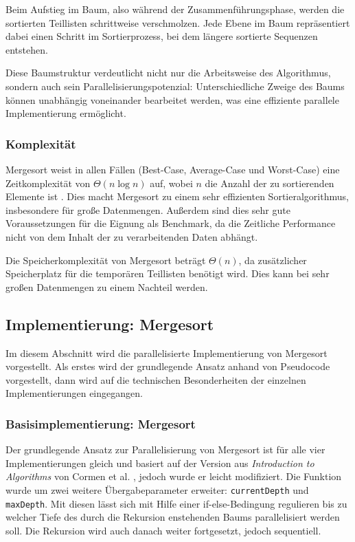 \documentclass[fontsize=12pt,paper=a4,twoside=semi,parskip=half-,headsepline,headinclude]{scrreprt}
\begin{document}
Beim Aufstieg im Baum, also während der Zusammenführungsphase, werden die sortierten Teillisten schrittweise verschmolzen. Jede Ebene im Baum repräsentiert dabei einen Schritt im Sortierprozess, bei dem längere sortierte Sequenzen entstehen.

Diese Baumstruktur verdeutlicht nicht nur die Arbeitsweise des Algorithmus, sondern auch sein Parallelisierungspotenzial: Unterschiedliche Zweige des Baums können unabhängig voneinander bearbeitet werden, was eine effiziente parallele Implementierung ermöglicht.

\subsubsection{Komplexität}

Mergesort weist in allen Fällen (Best-Case, Average-Case und Worst-Case) eine Zeitkomplexität von $\Theta(n \log n)$ auf, wobei $n$ die Anzahl der zu sortierenden Elemente ist \cite{Cormen2022}. Dies macht Mergesort zu einem sehr effizienten Sortieralgorithmus, insbesondere für große Datenmengen. Außerdem sind dies sehr gute Voraussetzungen für die Eignung als Benchmark, da die Zeitliche Performance nicht von dem Inhalt der zu verarbeitenden Daten abhängt.

Die Speicherkomplexität von Mergesort beträgt $\Theta(n)$, da zusätzlicher Speicherplatz für die temporären Teillisten benötigt wird. Dies kann bei sehr großen Datenmengen zu einem Nachteil werden.


\subsection{Implementierung: Mergesort}

Im diesem Abschnitt wird die parallelisierte Implementierung von Mergesort vorgestellt. Als erstes wird der grundlegende Ansatz anhand von Pseudocode vorgestellt, dann wird auf die technischen Besonderheiten der einzelnen Implementierungen eingegangen.

\subsubsection{Basisimplementierung: Mergesort}
\label{subsubsec:implms}

Der grundlegende Ansatz zur Parallelisierung von Mergesort ist für alle vier Implementierungen gleich und basiert auf der Version aus \emph{Introduction to Algorithms} von Cormen et al. \cite[S. 775]{Cormen2022}, jedoch wurde er leicht modifiziert. Die Funktion wurde um zwei weitere Übergabeparameter erweiter: \texttt{currentDepth} und \texttt{maxDepth}. Mit diesen lässt sich mit Hilfe einer if-else-Bedingung regulieren bis zu welcher Tiefe des durch die Rekursion enstehenden Baums parallelisiert werden soll. Die Rekursion wird auch danach weiter fortgesetzt, jedoch sequentiell.
\end{document}
